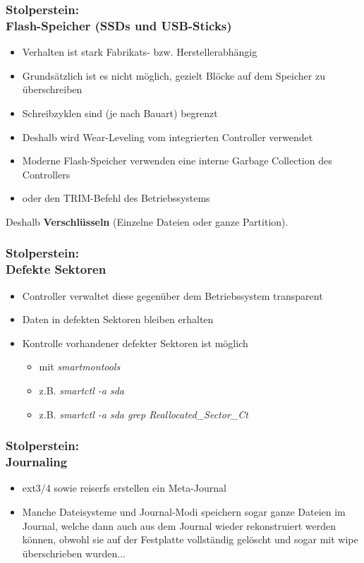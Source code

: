 \begin{frame}
  \frametitle{Stolperstein:\\Flash-Speicher (SSDs und USB-Sticks)}
  \begin{itemize}
    \item Verhalten ist stark Fabrikats- bzw. Herstellerabhängig
    \item Grundsätzlich ist es nicht möglich, gezielt Blöcke auf dem Speicher zu überschreiben
    \item Schreibzyklen sind (je nach Bauart) begrenzt
    \item Deshalb wird Wear-Leveling vom integrierten Controller verwendet
    \item Moderne Flash-Speicher verwenden eine interne Garbage Collection des Controllers
    \item oder den TRIM-Befehl des Betriebssystems
  \end{itemize}
  \pause
  \begin{alertblock}{Deshalb}
    {\bf Verschlüsseln} (Einzelne Dateien oder ganze Partition).
  \end{alertblock}
\end{frame}

\begin{frame}
  \frametitle{Stolperstein:\\Defekte Sektoren}
  \begin{itemize}
    \item Controller verwaltet diese gegenüber dem Betriebssystem transparent
    \item Daten in defekten Sektoren bleiben erhalten
    \item Kontrolle vorhandener defekter Sektoren ist möglich
    \begin{itemize}
      \item mit \textit{smartmontools}
      \item z.B. \textit{smartctl -a sda}
      \item z.B. \textit{smartctl -a sda  grep Reallocated\_Sector\_Ct}
    \end{itemize}
  \end{itemize}
\end{frame}

\begin{frame}
  \frametitle{Stolperstein:\\Journaling}
  \begin{itemize}
    \item ext3/4 sowie reiserfs erstellen ein Meta-Journal
    \item Manche Dateisysteme und Journal-Modi speichern sogar ganze Dateien im Journal, welche dann auch aus dem Journal wieder rekonstruiert werden können, obwohl sie auf der Festplatte vollständig gelöscht und sogar mit wipe überschrieben wurden...
  \end{itemize}
\end{frame}

